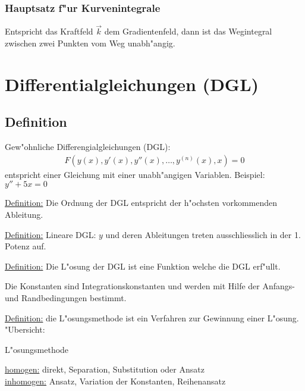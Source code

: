 \subsubsection{Hauptsatz f"ur Kurvenintegrale}
Entspricht das Kraftfeld $\overrightarrow{k}$ dem Gradientenfeld, dann ist das Wegintegral
zwischen zwei Punkten vom Weg unabh"angig.

\section{Differentialgleichungen (DGL)}
\subsection{Definition}
Gew"ohnliche Differengialgleichungen (DGL):
\begin{gather}
	F\left({y(x), y'(x), y''(x), \ldots, y^{(n)}(x), x}\right) = 0
\end{gather}
entspricht einer Gleichung mit einer unabh"angigen Variablen. Beispiel: $y'' + 5x = 0$

\underline{Definition:} Die Ordnung der DGL entspricht der h"ochsten vorkommenden Ableitung.

\underline{Definition:} Lineare DGL: $y$ und deren Ableitungen treten ausschliesslich in der 1. Potenz auf.

\underline{Definition:} Die L"osung der DGL ist eine Funktion welche die DGL erf"ullt.

Die Konstanten sind Integrationskonstanten und werden mit Hilfe der Anfangs- und
Randbedingungen bestimmt.

\underline{Definition:} die L"osungsmethode ist ein Verfahren zur Gewinnung einer L"osung. "Ubersicht: \\
\begin{center}
\begin{bundle}{L"osungsmethode}
\end{bundle}
\end{center}

\vspace{3mm}

\underline{homogen:} direkt, Separation, Substitution oder Ansatz \\
\underline{inhomogen:} Ansatz, Variation der Konstanten, Reihenansatz

